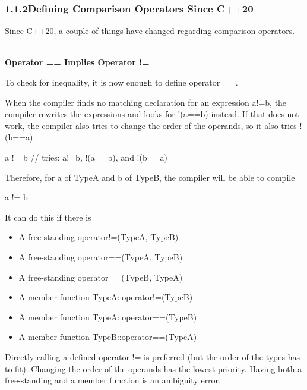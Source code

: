 \subsubsection*{ 1.1.2\hspace{0.2cm}Defining Comparison Operators Since C++20}

Since C++20, a couple of things have changed regarding comparison operators.

\noindent
\hspace*{\fill} \\ %
\textbf{Operator == Implies Operator !=}

To check for inequality, it is now enough to define operator ==.

When the compiler finds no matching declaration for an expression a!=b, the compiler rewrites the expressions and looks for !(a==b) instead. If that does not work, the compiler also tries to change the order of the operands, so it also tries !(b==a):

\begin{cpp}
a != b // tries: a!=b, !(a==b), and !(b==a)
\end{cpp}

Therefore, for a of TypeA and b of TypeB, the compiler will be able to compile

\begin{cpp}
a != b
\end{cpp}

It can do this if there is

\begin{itemize}
\item
A free-standing operator!=(TypeA, TypeB)

\item
A free-standing operator==(TypeA, TypeB)

\item
A free-standing operator==(TypeB, TypeA)

\item
A member function TypeA::operator!=(TypeB)

\item
A member function TypeA::operator==(TypeB)

\item
A member function TypeB::operator==(TypeA)
\end{itemize}

Directly calling a defined operator != is preferred (but the order of the types has to fit). Changing the order of the operands has the lowest priority. Having both a free-standing and a member function is an ambiguity error.

